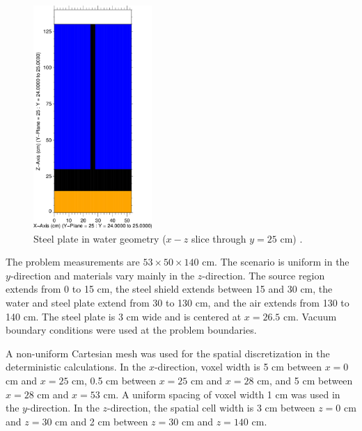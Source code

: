 \documentclass{article} %
\begin{document}
\begin{figure}[!htb]
\centering
\includegraphics[width=0.4\textwidth]{img/steel-xz.png}
\caption{Steel plate in water geometry ($x-z$ slice through $y = 25$ cm) 
         \cite{wilsonslaybaugh}.}
\label{steelxz}
\end{figure}

The problem measurements are $53\times50\times140$ cm. The scenario is uniform 
in the $y$-direction and materials vary mainly in the $z$-direction. The source
region extends from 0 to 15 cm, the steel shield extends between 15 and 30 cm, 
the water and steel plate extend from 30 to 130 cm, and the air extends from 
130 to 140 cm. The steel plate is 3 cm wide and is centered at $x = 26.5$ cm. 
Vacuum boundary conditions were used at the problem boundaries.

A non-uniform Cartesian mesh was used for the spatial discretization in the 
deterministic calculations. In the $x$-direction, voxel width is 5 cm between
$x = 0$ cm and $x = 25$ cm, 0.5 cm between $x = 25$ cm and $x = 28$ cm, and 5 
cm between $x = 28$ cm and $x = 53$ cm. A uniform spacing of voxel width 1 cm 
was used in the $y$-direction. In the $z$-direction, the spatial cell width is
3 cm between $z = 0$ cm and $z = 30$ cm and 2 cm between $z = 30$ cm and 
$z = 140$ cm.
\end{document}

